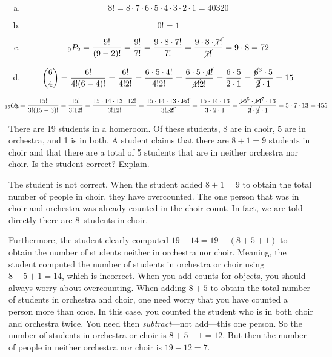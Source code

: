 \documentclass[11pt,letterpaper]{article}
\begin{document}
\sol 
\begin{enumerate}[(a)]
\item 
	\[
	8!= 8 \cdot 7 \cdot 6 \cdot 5 \cdot 4 \cdot 3 \cdot 2 \cdot 1= 40320
	\] \pspace

\item 
	\[
	0!= 1
	\] \pspace

\item 
	\[
	_9P_2= \dfrac{9!}{(9 - 2)!}= \dfrac{9!}{7!}= \dfrac{9 \cdot 8 \cdot 7!}{7!}= \dfrac{9 \cdot 8 \cdot \cancel{7!}}{\cancel{7!}}= 9 \cdot 8= 72
	\] \pspace

\item 
	\[
	\binom{6}{4}= \dfrac{6!}{4! (6 - 4)!}= \dfrac{6!}{4! 2!}= \dfrac{6 \cdot 5 \cdot 4!}{4! 2!}= \dfrac{6 \cdot 5 \cdot \cancel{4!}}{\cancel{4!} 2!}= \dfrac{6 \cdot 5}{2 \cdot 1}= \dfrac{\cancel{6}^3 \cdot 5}{\cancel{2} \cdot 1}= 15
	\] \pspace

\item 
	\[
	\hspace{-1cm} _{15}C_3= \dfrac{15!}{3! (15 - 3)!}= \dfrac{15!}{3! 12!}= \dfrac{15 \cdot 14 \cdot 13 \cdot 12!}{3! 12!}=  \dfrac{15 \cdot 14 \cdot 13 \cdot \cancel{12!}}{3! \cancel{12!}}= \dfrac{15 \cdot 14 \cdot 13}{3 \cdot 2 \cdot 1}= \dfrac{\cancel{15}^5 \cdot \cancel{14}^7 \cdot 13}{\cancel{3} \cdot \cancel{2} \cdot 1}= 5 \cdot 7 \cdot 13= 455
	\]
\end{enumerate}



\newpage



 There are 19 students in a homeroom. Of these students, 8 are in choir, 5 are in orchestra, and 1 is in both. A student claims that there are $8 + 1= 9$ students in choir and that there are a total of 5 students that are in neither orchestra nor choir. Is the student correct? Explain. \pspace

\sol The student is not correct. When the student added $8 + 1= 9$ to obtain the total number of people in choir, they have overcounted. The one person that was in choir and orchestra was already counted in the choir count. In fact, we are told directly there are 8~students in choir. \pspace

Furthermore, the student clearly computed $19 - 14= 19 - (8 + 5 + 1)$ to obtain the number of students neither in orchestra nor choir. Meaning, the student computed the number of students in orchestra or choir using $8 + 5 + 1= 14$, which is incorrect. When you add counts for objects, you should always worry about overcounting. When adding $8 + 5$ to obtain the total number of students in orchestra and choir, one need worry that you have counted a person more than once. In this case, you counted the student who is in both choir and orchestra twice. You need then \textit{subtract}---not add---this one person. So the number of students in orchestra or choir is $8 + 5 - 1= 12$. But then the number of people in neither orchestra nor choir is $19 - 12= 7$. 
\end{document}
